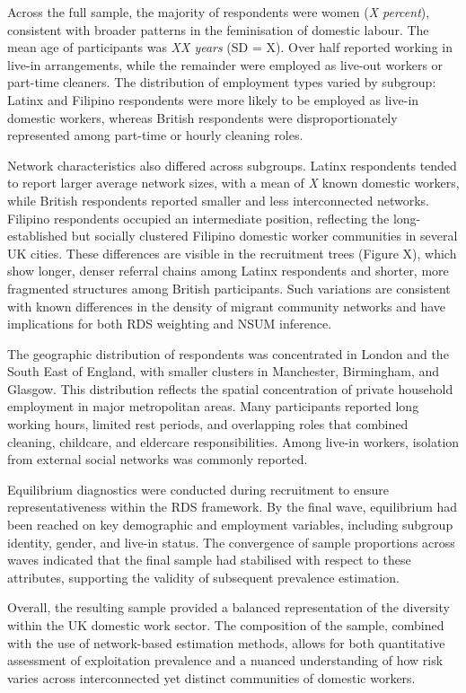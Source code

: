 \documentclass[
  12pt,
  letterpaper,
  DIV=11,
  numbers=noendperiod]{scrartcl}
\theoremstyle{plain}
\theoremstyle{definition}
\begin{document}
Across the full sample, the majority of respondents were women (\emph{X
percent}), consistent with broader patterns in the feminisation of
domestic labour. The mean age of participants was \emph{XX years} (SD =
X). Over half reported working in live-in arrangements, while the
remainder were employed as live-out workers or part-time cleaners. The
distribution of employment types varied by subgroup: Latinx and Filipino
respondents were more likely to be employed as live-in domestic workers,
whereas British respondents were disproportionately represented among
part-time or hourly cleaning roles.

Network characteristics also differed across subgroups. Latinx
respondents tended to report larger average network sizes, with a mean
of \emph{X} known domestic workers, while British respondents reported
smaller and less interconnected networks. Filipino respondents occupied
an intermediate position, reflecting the long-established but socially
clustered Filipino domestic worker communities in several UK cities.
These differences are visible in the recruitment trees (Figure X), which
show longer, denser referral chains among Latinx respondents and
shorter, more fragmented structures among British participants. Such
variations are consistent with known differences in the density of
migrant community networks and have implications for both RDS weighting
and NSUM inference.

The geographic distribution of respondents was concentrated in London
and the South East of England, with smaller clusters in Manchester,
Birmingham, and Glasgow. This distribution reflects the spatial
concentration of private household employment in major metropolitan
areas. Many participants reported long working hours, limited rest
periods, and overlapping roles that combined cleaning, childcare, and
eldercare responsibilities. Among live-in workers, isolation from
external social networks was commonly reported.

Equilibrium diagnostics were conducted during recruitment to ensure
representativeness within the RDS framework. By the final wave,
equilibrium had been reached on key demographic and employment
variables, including subgroup identity, gender, and live-in status. The
convergence of sample proportions across waves indicated that the final
sample had stabilised with respect to these attributes, supporting the
validity of subsequent prevalence estimation.

Overall, the resulting sample provided a balanced representation of the
diversity within the UK domestic work sector. The composition of the
sample, combined with the use of network-based estimation methods,
allows for both quantitative assessment of exploitation prevalence and a
nuanced understanding of how risk varies across interconnected yet
distinct communities of domestic workers.
\end{document}
